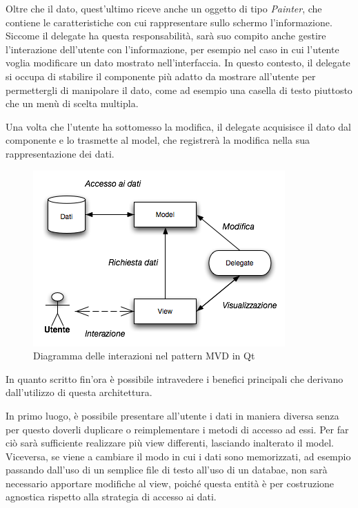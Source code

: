\documentclass[12pt]{toptesi}
\begin{document}
Oltre che il dato, quest'ultimo riceve anche un oggetto di tipo \emph{Painter}, che contiene le caratteristiche con cui rappresentare sullo schermo l'informazione. Siccome il delegate ha questa responsabilità, sarà suo compito anche gestire l'interazione dell'utente con l'informazione, per esempio nel caso in cui l'utente voglia modificare un dato mostrato nell'interfaccia. In questo contesto, il delegate si occupa di stabilire il componente più adatto da mostrare all'utente per permettergli di manipolare il dato, come ad esempio una casella di testo piuttosto che un menù di scelta multipla. 

Una volta che l'utente ha sottomesso la modifica, il delegate acquisisce il dato dal componente e lo trasmette al model, che registrerà la modifica nella sua rappresentazione dei dati. 

\begin{figure}[htbp]
\begin{center}
\includegraphics{images/mvd.png}
\caption{Diagramma delle interazioni nel pattern MVD in Qt}
\label{default}
\end{center}
\end{figure}


In quanto scritto fin'ora è possibile intravedere i benefici principali che derivano dall'utilizzo di questa architettura. 

In primo luogo, è possibile presentare all'utente i dati in maniera diversa senza per questo doverli duplicare o reimplementare i metodi di accesso ad essi. Per far ciò sarà sufficiente realizzare più view differenti, lasciando inalterato il model. Viceversa, se viene a cambiare il modo in cui i dati sono memorizzati, ad esempio passando dall'uso di un semplice file di testo all'uso di un databae, non sarà necessario apportare modifiche al view, poiché questa entità è per costruzione agnostica rispetto alla strategia di accesso ai dati.
\end{document}
